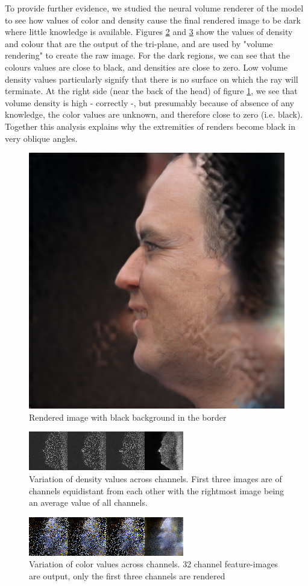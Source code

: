 To provide further evidence, we studied the neural volume renderer of the model to see how values of color and density cause the final rendered image to be dark where little knowledge is available. Figures \ref{fig:density_seed1} and \ref{fig:color_seed1} show the values of density and colour that are the output of the tri-plane, and are used by "volume rendering" to create the raw image. For the dark regions, we can see that the colours values are close to black, and densities are close to zero. Low volume density values particularly signify that there is no surface on which the ray will terminate. At the right side (near the back of the head) of figure \ref{fig:seed1_extreme_angle}, we see that volume density is high - correctly -, but presumably because of absence of any knowledge, the color values are unknown, and therefore close to zero (i.e. black). Together this analysis explains why the extremities of renders become black in very oblique angles.

\begin{figure}[H]
    \centering
    \includegraphics[width=0.5\linewidth]{seed0001.png}
    \caption{Rendered image with black background in the border}
    \label{fig:seed1_extreme_angle}
\end{figure}

\begin{figure}[H]
    \centering
    \includegraphics{test1blog.png}
    \caption{Variation of density values across channels. First three images are of channels equidistant from each other with the rightmost image being an average value of all channels.}
    \label{fig:density_seed1}
\end{figure}

\begin{figure}[H]
    \centering
    \includegraphics{test1cblog.png}
    \caption{Variation of color values across channels. 32 channel feature-images are output, only the first three channels are rendered}
    \label{fig:color_seed1}
\end{figure}